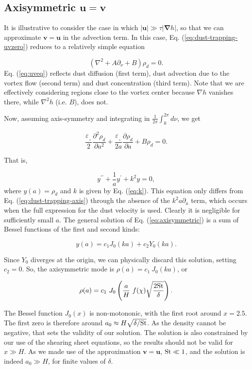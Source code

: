 \documentclass[apj]{emulateapj}
\newcommand{\pderiv}[2]{\frac{\partial #1}{\partial #2}}
\newcommand{\pderivn}[3]{\frac{\partial^{#3} #1}{\partial #2^{#3}}}
\renewcommand{\v}[1]{{\boldsymbol{#1}}} %
\newcommand{\del}{\v{\nabla}}
\newcommand{\grad}{\del}
\newcommand{\Laplace}{\nabla^2}
\newcommand{\Eq}[1]{Eq. (\ref{#1})}
\newcommand{\eq}[1]{\Eq{#1}}
\newcommand{\beq}{\begin{equation}}
\newcommand{\eeq}{\end{equation}}
\newcommand{\epsp}{\varepsilon_{_{+}}}
\begin{document}
\subsection{Axisymmetric $\v{u} = \v{v}$ }

It is illustrative to consider the case in which $|\v{u}| \gg \tau|\grad{h}|$,
so that we can approximate $\v{v}=\v{u}$ in the advection term.  In 
this case, \eq{eq:dust-trapping-uvzero} reduces to a relatively simple equation

\beq\label{eq:uveq}
\left(\Laplace{} + A\partial_\nu + B \right)\rho_d = 0. 
\eeq
\eq{eq:uveq} reflects dust diffusion (first term), dust advection due
to the vortex flow (second term) and dust concentration (third term). 
Note that we are effectively considering regions close to the vortex
center because $\nabla h$ vanishes there, while  
$\nabla^2h$ (i.e. $B$), does not.  

Now, assuming axis-symmetry and integrating in
$\frac{1}{2\pi} \int_0^{2\pi} d\nu$, we get  

\beq
\frac{\epsp}{2}\pderivn{\rho_d}{a}{2} +
\frac{\epsp}{2a}\pderiv{\rho_d}{a} + B \rho_d = 0.
\eeq

\noindent That is, 

\beq
y^{\prime\prime} + \frac{1}{a}y^\prime + k^2 y = 0, 
\label{eq:axisymmetric}
\eeq where $y(a) = \rho_d$ and $k$ is given by \eq{eq:k}. This
equation only differs from \eq{eq:dust-trapping-axis} through the
absence of the $k^2a\partial_a$ term, which occurs when the full
expression for the dust velocity is used. Clearly it is negligible 
for sufficiently small $a$. The general solution of \eq{eq:axisymmetric} is a
sum of Bessel functions of the first and second kinds: 

\beq
y(a) = c_1 J_0 (ka) + c_2 Y_0(ka). 
\eeq

\noindent Since  $Y_0$ diverges at the origin, we can physically discard 
this solution, setting $c_2=0$. So, the axisymmetric mode is $\rho(a)
= c_1 \ J_0 (ka)$, or

\beq
\rho(a) = c_1 \ J_0 \left(\frac{a}{H} \ f(\chi) \sqrt{\frac{2{\rm St}}{\delta}}\right).
\eeq 

The Bessel function $J_0(x)$ is
non-motononic, with the first root around $x=2.5$. The first zero is therefore around
$a_0 \approx H \sqrt{\delta/{\rm St}}$.  As the density
cannot be negative, that sets the validity of our solution. 
The solution is also constrained by our use of the shearing sheet
equations, so the results should not be valid for $x \gg H$.
As we made use of the approximation $\v{v}=\v{u}$, ${\rm St} \ll 1$,
and the solution  is indeed $a_0 \gg H$, for finite values of $\delta$.
\end{document}

